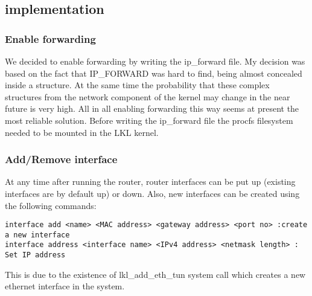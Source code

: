 {{\subsection{\project implementation}
\label{sub-sec:router-lklnet}
\subsubsection{Enable forwarding}
We decided to enable forwarding by writing the ip_forward file. My decision was based on the fact that IP_FORWARD was hard to find, being almost concealed inside a structure. At the same time the probability that these complex structures from the network component of the kernel may change in the near future is very high. All in all enabling forwarding this way seems at present the most reliable solution.
Before writing the ip_forward file the procfs filesystem needed to be mounted in the LKL kernel. 

\subsubsection{Add/Remove interface}
At any time after running the router, router interfaces can be put up (existing interfaces are by default up) or down. Also, new interfaces can be created using the following commands:
\lstset{language=zsh,caption=Adding a new interface,label=lst:saddrule}
\begin{lstlisting}
interface add <name> <MAC address> <gateway address> <port no> :create a new interface
interface address <interface name> <IPv4 address> <netmask length> : Set IP address 
\end{lstlisting}  
This is due to the existence of lkl_add_eth_tun system call which creates a new ethernet interface in the system.
 
}}
